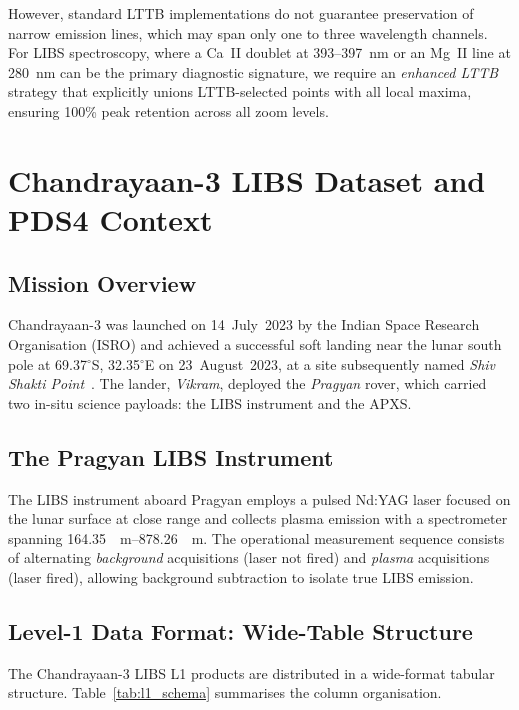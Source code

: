 \documentclass[a4paper,twocolumn,10pt]{article}
\begin{document}
However, standard LTTB implementations do not guarantee preservation
of narrow emission lines, which may span only one to three wavelength
channels.  For LIBS spectroscopy, where a Ca~II doublet at 393--397~nm
or an Mg~II line at 280~nm can be the primary diagnostic signature,
we require an \emph{enhanced LTTB} strategy that explicitly unions
LTTB-selected points with all local maxima, ensuring 100\% peak
retention across all zoom levels.


\section{Chandrayaan-3 LIBS Dataset and PDS4 Context}
\label{sec:data}

\subsection{Mission Overview}

Chandrayaan-3 was launched on 14~July~2023 by the Indian Space Research
Organisation (ISRO) and achieved a successful soft landing near the
lunar south pole at 69.37$^\circ$S, 32.35$^\circ$E on 23~August~2023,
at a site subsequently named \emph{Shiv Shakti Point}~\cite{ISROCh3}.
The lander, \emph{Vikram}, deployed the \emph{Pragyan} rover, which
carried two in-situ science payloads: the LIBS instrument and the APXS.

\subsection{The Pragyan LIBS Instrument}

The LIBS instrument aboard Pragyan employs a pulsed Nd:YAG laser
focused on the lunar surface at close range and collects plasma
emission with a spectrometer spanning \SIrange{164.35}{878.26}{\nano
\metre}.  The operational measurement sequence consists of alternating
\emph{background} acquisitions (laser not fired) and \emph{plasma}
acquisitions (laser fired), allowing background subtraction to isolate
true LIBS emission.

\subsection{Level-1 Data Format: Wide-Table Structure}

The Chandrayaan-3 LIBS L1 products are distributed in a wide-format
tabular structure.  Table~\ref{tab:l1_schema} summarises the column
organisation.
\end{document}
